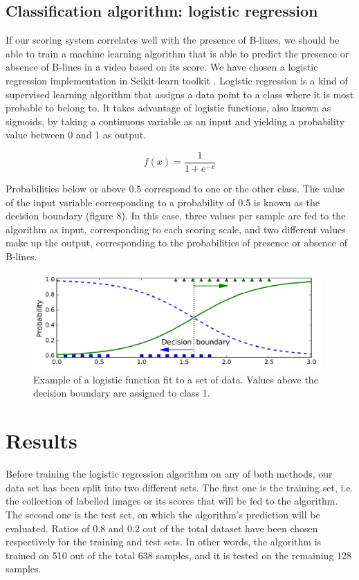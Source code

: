 \documentclass[11pt]{article} %
\begin{document}
\subsection{Classification algorithm: logistic regression}

	If our scoring system correlates well with the presence of B-lines, we should be able to train a machine learning algorithm that is able to predict the presence or absence of B-lines in a video based on its score. We have chosen a logistic regression implementation in Scikit-learn toolkit \cite{sklearn}. Logistic regression is a kind of supervised learning algorithm that assigns a data point to a class where it is most probable to belong to. It takes advantage of logistic functions, also known as sigmoids, by taking a continuous variable as an input and yielding a probability value between 0 and 1 as output. 

	\[ f(x) = \frac{1}{1+ e^{-x}} \]
	
	Probabilities below or above 0.5 correspond to one or the other class. The value of the input variable corresponding to a probability of 0.5 is known as the decision boundary (figure 8). In this case, three values per sample are fed to the algorithm as input, corresponding to each scoring scale, and two different values make up the output, corresponding to the probabilities of presence or absence of B-lines.
	
	\begin{figure}
	\centering
	\includegraphics[width=11cm]{figuras/sigmoid.png}
	\caption{Example of a logistic function fit to a set of data. Values above the decision boundary are assigned to class 1. \cite{geron}}
	\end{figure}

\section{Results}
	
	Before training the logistic regression algorithm on any of both methods, our data set has been split into two different sets. The first one is the training set, i.e. the collection of labelled images or its scores that will be fed to the algorithm. The second one is the test set, on which the algorithm's prediction will be evaluated. Ratios of 0.8 and 0.2  out of the total dataset have been chosen respectively for the training and test sets. In other words, the algorithm is trained on 510 out of the total 638 samples, and it is tested on the remaining 128 samples.
	
\end{document}
